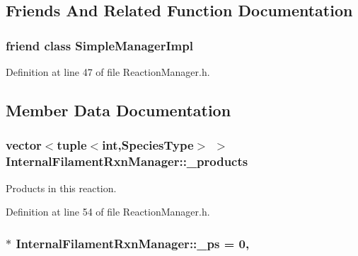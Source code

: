 \subsection{Friends And Related Function Documentation}
\hypertarget{classInternalFilamentRxnManager_a65026d22c7682cf798dda845cac7573a}{
\subsubsection[{Simple\+Manager\+Impl}]{\setlength{\rightskip}{0pt plus 5cm}friend class {\bf Simple\+Manager\+Impl}\hspace{0.3cm}{\ttfamily [friend]}}}\label{classInternalFilamentRxnManager_a65026d22c7682cf798dda845cac7573a}


Definition at line 47 of file Reaction\+Manager.\+h.



\subsection{Member Data Documentation}
\hypertarget{classInternalFilamentRxnManager_afd213da1a3706e2e88962e5da886a5dc}{
\subsubsection[{\+\_\+products}]{\setlength{\rightskip}{0pt plus 5cm}vector$<$tuple$<$int,{\bf Species\+Type}$>$ $>$ Internal\+Filament\+Rxn\+Manager\+::\+\_\+products\hspace{0.3cm}{\ttfamily [protected]}}}\label{classInternalFilamentRxnManager_afd213da1a3706e2e88962e5da886a5dc}


Products in this reaction. 



Definition at line 54 of file Reaction\+Manager.\+h.

\hypertarget{classInternalFilamentRxnManager_a973ce9cc2aae811e6867afa46193c5f2}{
\subsubsection[{\+\_\+ps}]{ $\ast$ Internal\+Filament\+Rxn\+Manager\+::\+\_\+ps = 0\hspace{0.3cm}{\ttfamily [static]}, {\ttfamily [protected]}}}\label{classInternalFilamentRxnManager_a973ce9cc2aae811e6867afa46193c5f2}


